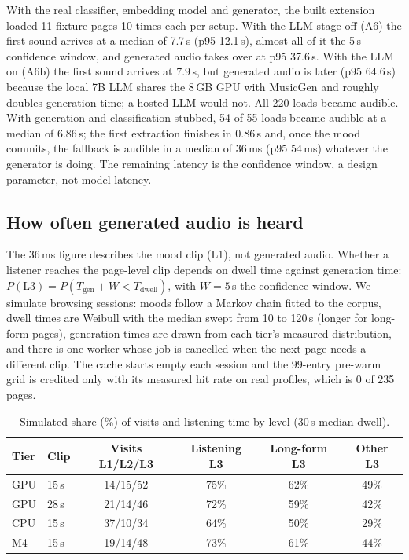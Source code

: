 \documentclass[conference]{IEEEtran}
\begin{document}
With the real classifier, embedding model and generator, the built extension
loaded 11 fixture pages 10 times each per setup. With the LLM stage off (A6) the
first sound arrives at a median of 7.7\,s (p95 12.1\,s), almost all of it the 5\,s
confidence window, and generated audio takes over at p95 37.6\,s. With the LLM on
(A6b) the first sound arrives at 7.9\,s, but generated audio is later (p95
64.6\,s) because the local 7B LLM shares the 8\,GB GPU with MusicGen and roughly
doubles generation time; a hosted LLM would not. All 220 loads became audible. With
generation and classification stubbed, 54 of 55 loads became audible at a median
of 6.86\,s; the first extraction finishes in 0.86\,s and, once the mood commits, the
fallback is audible in a median of 36\,ms (p95 54\,ms) whatever the generator is
doing. The remaining latency is the confidence window, a design parameter, not
model latency.

\subsection{How often generated audio is heard}
\label{sec:res-exposure}

The 36\,ms figure describes the mood clip (L1), not generated audio. Whether a
listener reaches the page-level clip depends on dwell time against generation
time: $P(\mathrm{L3}) = P(T_{\mathrm{gen}} + W < T_{\mathrm{dwell}})$, with
$W = 5$\,s the confidence window. We simulate browsing sessions: moods follow a
Markov chain fitted to the corpus, dwell times are Weibull \cite{liudwell} with
the median swept from 10 to 120\,s (longer for long-form pages), generation times
are drawn from each tier's measured distribution, and there is one worker whose
job is cancelled when the next page needs a different clip. The cache starts empty
each session and the 99-entry pre-warm grid is credited only with its measured hit
rate on real profiles, which is 0 of 235 pages.

\begin{table}[t]
\caption{Simulated share (\%) of visits and listening time by level (30\,s median dwell).}
\label{tab:exposure}
\begin{center}
\scriptsize
\setlength{\tabcolsep}{3pt}
\begin{tabular}{llcccc}
\toprule
\textbf{Tier} & \textbf{Clip} & \textbf{Visits L1/L2/L3} & \textbf{Listening L3} & \textbf{Long-form L3} & \textbf{Other L3} \\
\midrule
GPU & 15\,s & 14/15/52 & 75\% & 62\% & 49\% \\
GPU & 28\,s & 21/14/46 & 72\% & 59\% & 42\% \\
CPU & 15\,s & 37/10/34 & 64\% & 50\% & 29\% \\
M4  & 15\,s & 19/14/48 & 73\% & 61\% & 44\% \\
\bottomrule
\end{tabular}
\end{center}
\end{table}
\end{document}

